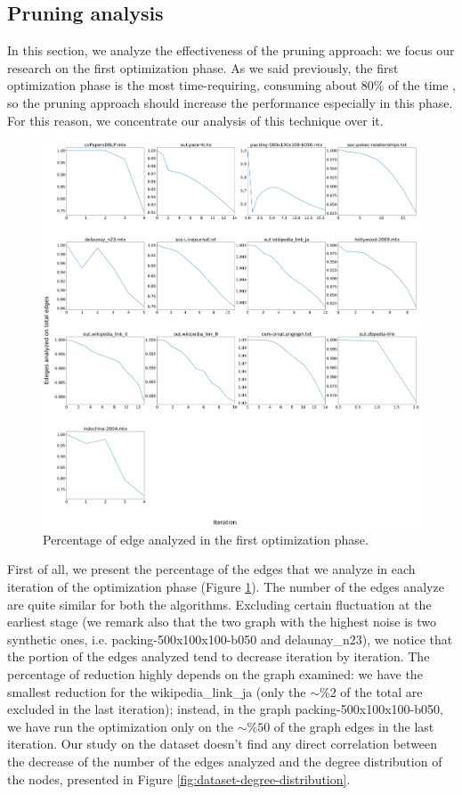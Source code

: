 \subsection{Pruning analysis}
In this section, we analyze the effectiveness of the pruning approach: we focus our research on the first optimization phase. As we said previously, the first optimization phase is the most time-requiring, consuming about 80\% of the time \cite{wickramaarachchi2014fast}, so the pruning approach should increase the performance especially in this phase. For this reason, we concentrate our analysis of this technique over it.
\begin{figure}[h]
	\centering
	\includegraphics[width=1\linewidth]{0-resources/edge-percentage}
	\caption{Percentage of edge analyzed in the first optimization phase.}
	\label{fig:edge-percentage}
\end{figure}
First of all, we present the percentage of the edges that we analyze in each iteration of the optimization phase (Figure \ref{fig:edge-percentage}). The number of the edges analyze are quite similar for both the algorithms. Excluding certain fluctuation at the earliest stage (we remark also that the two graph with the highest noise is two synthetic ones, i.e. packing-500x100x100-b050 and delaunay\_n23), we notice that the portion of the edges analyzed tend to decrease iteration by iteration. The percentage of reduction highly depends on the graph examined: we have the smallest reduction for the wikipedia\_link\_ja (only the $\sim\%2$ of the total are excluded in the last iteration); instead, in the graph packing-500x100x100-b050, we have run the optimization only on the $\sim\%50$ of the graph edges in the last iteration. Our study on the dataset doesn't find any direct correlation between the decrease of the number of the edges analyzed and the degree distribution of the nodes, presented in Figure \ref{fig:dataset-degree-distribution}.
